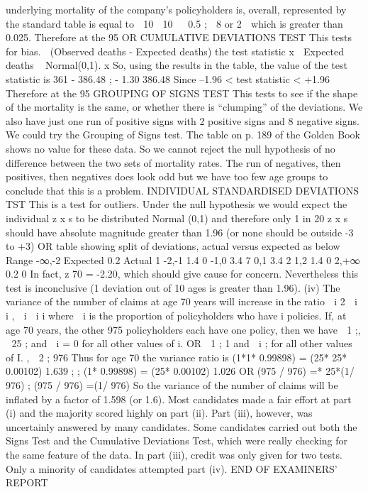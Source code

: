 \documentclass[a4paper,12pt]{article}
\begin{document}
underlying mortality of the company’s policyholders is, overall, represented
by the standard table is equal to
 10  10

 0.5 ;\+
 8 or 2 
which is greater than 0.025.
Therefore at the 95%
OR CUMULATIVE DEVIATIONS TEST
This tests for bias.
 (Observed deaths - Expected deaths)
the test statistic
x
 Expected deaths
~ Normal(0,1).
x
So, using the results in the table, the value of the test statistic is
361 - 386.48
;\+\; - 1.30
386.48
Since –1.96 < test statistic < +1.96
Therefore at the 95%
GROUPING OF SIGNS TEST
This tests to see if the shape of the mortality is the same, or whether there is
“clumping” of the deviations.
We also have just one run of positive signs with 2 positive signs and 8
negative signs.
We could try the Grouping of Signs test. The table on p. 189 of the Golden
Book shows no value for these data. So we cannot reject the null hypothesis
of no difference between the two sets of mortality rates.
The run of negatives, then positives, then negatives does look odd but we have
too few age groups to conclude that this is a problem.
INDIVIDUAL STANDARDISED DEVIATIONS TST
This is a test for outliers.
Under the null hypothesis we would expect the individual z x s to be distributed
Normal (0,1)
and therefore only 1 in 20 z x s should have absolute magnitude greater than
1.96 (or none should be outside -3 to +3)
OR
table showing split of deviations, actual versus expected as below
Range
-∞,-2
Expected 0.2
Actual
1
-2,-1
1.4
0
-1,0
3.4
7
0,1
3.4
2
1,2
1.4
0
2,+∞
0.2
0
In fact, z 70 = -2.20, which should give cause for concern.
Nevertheless this test is inconclusive (1 deviation out of 10 ages is greater than
1.96).
(iv)
The variance of the number of claims at age 70 years will increase in the ratio
 i 2  i
i
,
 i  i
i
where  i is the proportion of policyholders who have i policies.
If, at age 70 years, the other 975 policyholders each have one policy, then we
have
 1 ;\+,  25 ;\+ and  i = 0 for all other values of i.
OR
 1 ;\+
1
and  i ;\+ for all other values of I.
,  2 ;\+
976
Thus for age 70 the variance ratio is
(1*1* 0.99898) \;=\; (25* 25* 0.00102) 1.639
;\+\;
;\+
(1* 0.99898) \;=\; (25* 0.00102)
1.026
OR
(975 / 976) \;=* 25*(1/ 976)
;\+
(975 / 976) \;=(1/ 976)
So the variance of the number of claims will be inflated by a factor of 1.598
(or 1.6).
Most candidates made a fair effort at part (i) and the majority scored highly on
part (ii). Part (iii), however, was uncertainly answered by many candidates.
Some candidates carried out both the Signs Test and the Cumulative
Deviations Test, which were really checking for the same feature of the data.
In part (iii), credit was only given for two tests. Only a minority of candidates
attempted part (iv).
END OF EXAMINERS’ REPORT
\end{document}

